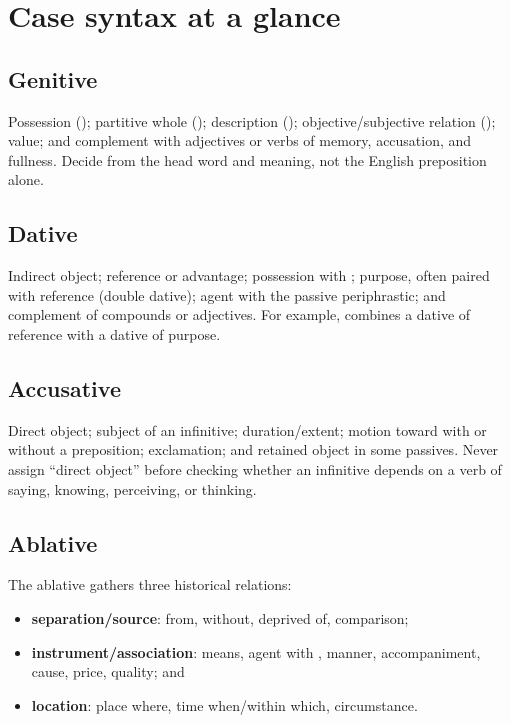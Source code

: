 \chapter{Case syntax at a glance}


\section{Genitive}

Possession (); partitive whole ();
description (); objective/subjective relation
(); value; and complement with adjectives or verbs of memory,
accusation, and fullness. Decide from the head word and meaning, not the English
preposition alone.

\section{Dative}

Indirect object; reference or advantage; possession with ; purpose,
often paired with reference (double dative); agent with the passive
periphrastic; and complement of compounds or adjectives. For example,
 combines a dative of reference with a dative of purpose.

\section{Accusative}

Direct object; subject of an infinitive; duration/extent; motion toward with or
without a preposition; exclamation; and retained object in some passives.
Never assign ``direct object'' before checking whether an infinitive depends on
a verb of saying, knowing, perceiving, or thinking.

\section{Ablative}

The ablative gathers three historical relations:

\begin{itemize}
  \item \textbf{separation/source}: from, without, deprived of, comparison;
  \item \textbf{instrument/association}: means, agent with , manner,
        accompaniment, cause, price, quality; and
  \item \textbf{location}: place where, time when/within which, circumstance.
\end{itemize}


